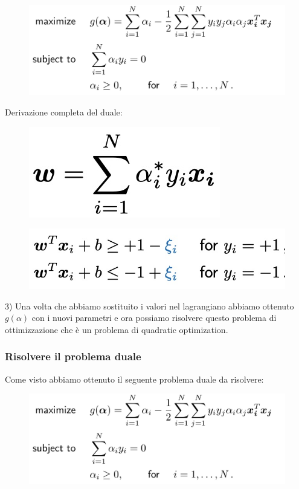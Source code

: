 \documentclass[14pt]{extreport}
\begin{document}
\begin{figure}[H]
	\centering
	\includegraphics[width=0.7\linewidth]{318.jpeg}
\end{figure}

Derivazione completa del duale:

\begin{figure}[H]
	\centering
	\includegraphics[width=\linewidth]{319.jpeg}
\end{figure}
\begin{figure}[H]
	\centering
	\includegraphics[width=\linewidth]{320.jpeg}
\end{figure}

3) Una volta che abbiamo sostituito i valori nel lagrangiano abbiamo ottenuto $g(\alpha)$ con i nuovi parametri e ora possiamo risolvere questo
problema di ottimizzazione che è un problema di quadratic optimization.

\subsubsection{Risolvere il problema duale}

Come visto abbiamo ottenuto il seguente problema duale da risolvere:
\begin{figure}[H]
	\centering
	\includegraphics[width=0.7\linewidth]{318.jpeg}
\end{figure}
\end{document}
